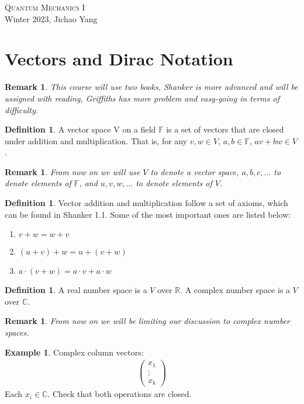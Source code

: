 \documentclass[12pt]{article}
\def\C{{\mathbb{C}}}
\numberwithin{theorem}{section}
\newtheorem{remark}[theorem]{Remark}
\theoremstyle{definition}
\newtheorem{definition}[theorem]{Definition}
\newtheorem{example}[theorem]{Example}
\begin{document}
\begin{flushright}
    \textsc{\LARGE Quantum Mechanics I}\\
    Winter 2023, Jichao Yang
\end{flushright}

\section{Vectors and Dirac Notation}

\begin{remark}
    This course will use two books, Shanker is more advanced and will be assigned with reading, Griffiths has more problem and easy-going in terms of difficulty.
\end{remark}

\begin{definition}
    A vector space V on a field $\mathbb{F}$ is a set of vectors that are closed under addition and multiplication. That is, for any $v, w\in V$, $a,b\in\mathbb{F}$, $av+bw\in V$.
\end{definition}

\begin{remark}
    From now on we will use $V$ to denote a vector space, $a,b,c,\dots$ to denote elements of $\mathbb{F}$, and $u,v,w,\dots$ to denote elements of $V$.
\end{remark}

\begin{definition}
    Vector addition and multiplication follow a set of axioms, which can be found in Shanker 1.1. Some of the most important ones are listed below:
    \begin{enumerate}
        \item $v+w = w+v$
        \item $(u+v)+w = u+(v+w)$
        \item $a\cdot(v+w) = a\cdot v + a\cdot w$
    \end{enumerate}
\end{definition}

\begin{definition}
    A real number space is a $V$ over $\mathbb{R}$. A complex number space is a $V$ over $\mathbb{C}$.
\end{definition}

\begin{remark}
    From now on we will be limiting our discussion to complex number spaces.
\end{remark}

\begin{example}
    Complex column vectors:    
    \begin{align}
        \begin{pmatrix}
            x_1 \\
            \vdots \\
            x_k
        \end{pmatrix}
    \end{align}
    Each $x_i\in \C$. Check that both operations are closed.
\end{example}
\end{document}
